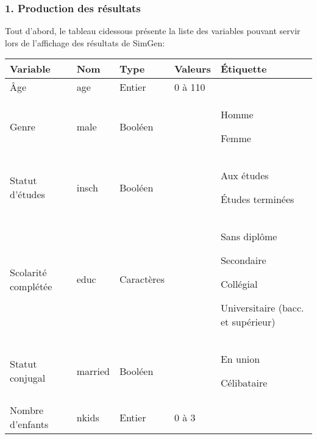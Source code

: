 \documentclass[letterpaper,10pt,french]{sphinxmanual}
\begin{document}
\begin{DUlineblock}{0em}
\item[] 
\end{DUlineblock}


\subsubsection{1. Production des résultats}
\label{\detokenize{utilisation:production-des-resultats}}
Tout d’abord, le tableau ci\sphinxhyphen{}dessous présente la liste des variables pouvant servir lors de l’affichage des résultats de SimGen:


\begin{savenotes}\sphinxattablestart
\centering
\begin{tabulary}{\linewidth}[t]{|T|T|T|T|T|}
\hline
\sphinxstyletheadfamily 
Variable
&\sphinxstyletheadfamily 
Nom
&\sphinxstyletheadfamily 
Type
&\sphinxstyletheadfamily 
Valeurs
&\sphinxstyletheadfamily 
Étiquette
\\
\hline
Âge
&
age
&
Entier
&
0 à 110
&\\
\hline
Genre
&
male
&
Booléen
&

&
Homme

Femme
\\
\hline
Statut d’études
&
insch
&
Booléen
&

&
Aux études

Études terminées
\\
\hline
Scolarité complétée
&
educ
&
Caractères
&



&
Sans diplôme

Secondaire

Collégial

Universitaire (bacc. et supérieur)
\\
\hline
Statut conjugal
&
married
&
Booléen
&

&
En union

Célibataire
\\
\hline
Nombre d’enfants
&
nkids
&
Entier
&
0 à 3
&\\
\hline
\end{tabulary}
\par
\sphinxattableend\end{savenotes}
\end{document}
